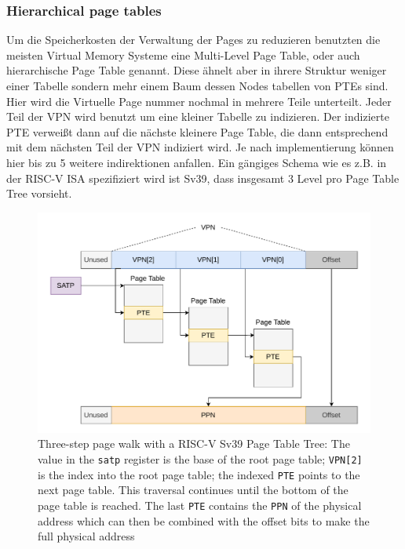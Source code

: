 \subsubsection{Hierarchical page tables}
Um die Speicherkosten der Verwaltung der Pages zu reduzieren benutzten die meisten 
Virtual Memory Systeme eine Multi-Level Page Table, oder auch hierarchische Page Table genannt.
Diese ähnelt aber in ihrere Struktur weniger einer Tabelle sondern mehr einem Baum dessen Nodes tabellen
von PTEs sind.
Hier wird die Virtuelle Page nummer nochmal in mehrere Teile unterteilt. Jeder Teil der VPN
wird benutzt um eine kleiner Tabelle zu indizieren. Der indizierte PTE verweißt dann auf die
nächste kleinere Page Table, die dann entsprechend mit dem nächsten Teil der VPN indiziert wird.
Je nach implementierung können hier bis zu 5 weitere indirektionen anfallen.
Ein gängiges Schema wie es z.B. in der RISC-V ISA spezifiziert wird ist Sv39, dass insgesamt
3 Level pro Page Table Tree vorsieht\cite{riscvreader}.
\begin{figure}[t]
    \centering
    \includegraphics[scale=.8]{figures/VM-Tree.pdf}
    \caption[RISC-V Sv39 3-Level Page Tree]{Three-step page walk with a RISC-V Sv39 Page Table Tree:
        The value in the \texttt{satp} register is the base of the root page table; \texttt{VPN[2]}
        is the index into the root page table; the indexed \texttt{PTE} points to the next page table.
        This traversal continues until the bottom of the page table is reached. The last \texttt{PTE}
        contains the \texttt{PPN} of the physical address which can then be combined with the offset
        bits to make the full physical address}
    \label{fig:fund:pagetree}
\end{figure}

